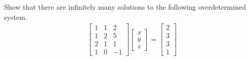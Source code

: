 \begin{exmp}
Show that there are infinitely many solutions to the following overdetermined system.
\begin{align*}
\begin{bmatrix}
1 & 1 & 2 \\
1 & 2 & 5 \\
2 & 1 & 1 \\
1 & 0 & -1
\end{bmatrix}
\begin{bmatrix}
x \\
y \\ 
z
\end{bmatrix}
=
\begin{bmatrix}
2 \\
3 \\
3 \\
1
\end{bmatrix}   
\end{align*}
\end{exmp}
